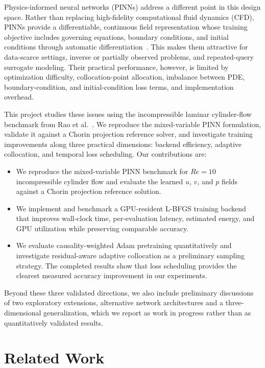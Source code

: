 \documentclass{article}
\begin{document}
Physics-informed neural networks (PINNs) address a different point in this design space. Rather than replacing high-fidelity computational fluid dynamics (CFD), PINNs provide a differentiable, continuous field representation whose training objective includes governing equations, boundary conditions, and initial conditions through automatic differentiation~\cite{raissi2019pinn,karniadakis2021pinnreview}. This makes them attractive for data-scarce settings, inverse or partially observed problems, and repeated-query surrogate modeling. Their practical performance, however, is limited by optimization difficulty, collocation-point allocation, imbalance between PDE, boundary-condition, and initial-condition loss terms, and implementation overhead.

This project studies these issues using the incompressible laminar cylinder-flow benchmark from Rao et al.~\cite{rao2020pinnflow}. We reproduce the mixed-variable PINN formulation, validate it against a Chorin projection reference solver, and investigate training improvements along three practical dimensions: backend efficiency, adaptive collocation, and temporal loss scheduling. Our contributions are:
\begin{itemize}
    \item We reproduce the mixed-variable PINN benchmark for $Re=10$ incompressible cylinder flow and evaluate the learned $u$, $v$, and $p$ fields against a Chorin projection reference solution.
    \item We implement and benchmark a GPU-resident L-BFGS training backend that improves wall-clock time, per-evaluation latency, estimated energy, and GPU utilization while preserving comparable accuracy.
    \item We evaluate causality-weighted Adam pretraining quantitatively and investigate residual-aware adaptive collocation as a preliminary sampling strategy. The completed results show that loss scheduling provides the clearest measured accuracy improvement in our experiments.
\end{itemize}
Beyond these three validated directions, we also include preliminary discussions of two exploratory extensions, alternative network architectures and a three-dimensional generalization, which we report as work in progress rather than as quantitatively validated results.

\section{Related Work}
\end{document}
